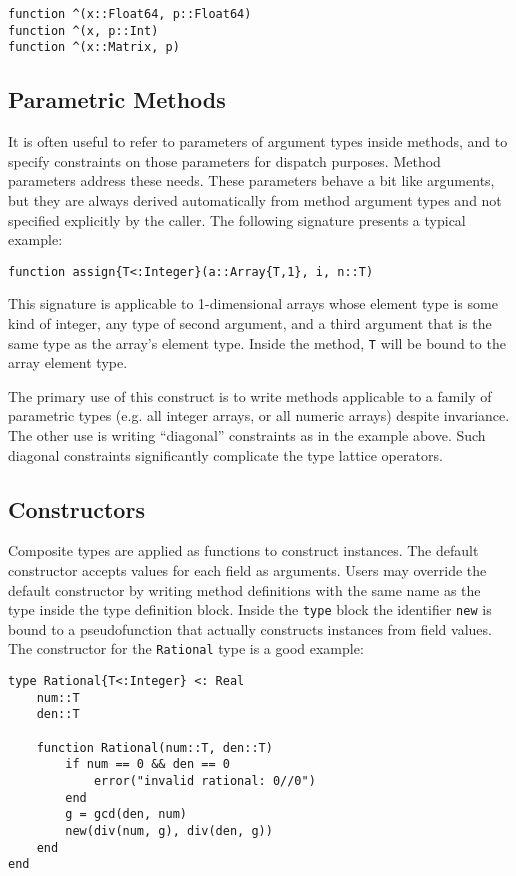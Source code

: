 \documentclass[9pt]{sigplanconf}
\begin{document}
\begin{verbatim}
function ^(x::Float64, p::Float64)
function ^(x, p::Int)
function ^(x::Matrix, p)
\end{verbatim}

\subsection{Parametric Methods}

It is often useful to refer to parameters of argument types inside methods,
and to specify constraints on those parameters for dispatch purposes.
Method parameters address these needs. These parameters behave a bit like
arguments, but they are always derived automatically from
method argument types and not specified explicitly by the caller.
The following signature presents a typical example:

\begin{verbatim}
function assign{T<:Integer}(a::Array{T,1}, i, n::T)
\end{verbatim}

This signature is applicable to 1-dimensional arrays whose element type is
some kind of integer, any type of second argument, and a third argument
that is the same type as the array's element type. Inside the method,
{\tt T} will be bound to the array element type.

The primary use of this construct is to write methods applicable to a
family of parametric types
(e.g. all integer arrays, or all numeric arrays)
despite invariance. The other use is
writing ``diagonal'' constraints as in the example above. Such diagonal
constraints significantly complicate the type lattice operators.


\subsection{Constructors}

Composite types are applied as functions to construct instances.
The default constructor accepts values for each field as arguments.
Users may override the default constructor by writing method definitions
with the same name as the type inside the type definition block. Inside the
{\tt type} block the identifier {\tt new} is bound to a pseudofunction
that actually constructs instances from field values. The constructor
for the {\tt Rational} type is a good example:

\begin{verbatim}
type Rational{T<:Integer} <: Real
    num::T
    den::T

    function Rational(num::T, den::T)
        if num == 0 && den == 0
            error("invalid rational: 0//0")
        end
        g = gcd(den, num)
        new(div(num, g), div(den, g))
    end
end
\end{verbatim}
\end{document}
